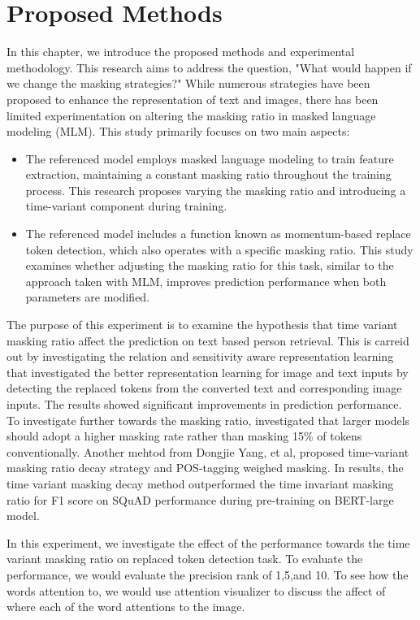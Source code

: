 \chapter{Proposed Methods}
In this chapter, we introduce the proposed methods and experimental methodology. This research aims to address the question, "What would happen if we change the masking strategies?" While numerous strategies have been proposed to enhance the representation of text and images, there has been limited experimentation on altering the masking ratio in masked language modeling (MLM). This study primarily focuses on two main aspects:

\begin{itemize}
  \item The referenced model employs masked language modeling to train feature extraction, maintaining a constant masking ratio throughout the training process. This research proposes varying the masking ratio and introducing a time-variant component during training.
  \item The referenced model includes a function known as momentum-based replace token detection, which also operates with a specific masking ratio. This study examines whether adjusting the masking ratio for this task, similar to the approach taken with MLM, improves prediction performance when both parameters are modified.
\end{itemize}
The purpose of this experiment is to examine the hypothesis that time variant masking ratio affect the prediction on text based person retrieval.
This is carreid out by investigating the relation and sensitivity aware representation learning \cite{Bai2023RaSaRA} that investigated the better representation learning for image and text inputs by detecting the replaced tokens from the converted text and corresponding image inputs. The results showed significant improvements in prediction performance. To investigate further towards the masking ratio, \cite{wettig-etal-2023-mask} investigated that larger models should adopt a higher masking rate rather than masking 15\% of tokens conventionally. Another mehtod from Dongjie Yang, et al, \cite{yang2023learningbettermaskingbetter} proposed time-variant masking ratio decay strategy and POS-tagging weighed masking. In results, the time variant masking decay method outperformed the time invariant masking ratio for F1 score on SQuAD performance during pre-training on BERT-large model. 

In this experiment, we investigate the effect of the performance towards the time variant masking ratio on replaced token detection task. To evaluate the performance, we would evaluate the precision rank of 1,5,and 10. To see how the words attention to, we would use attention visualizer to discuss the affect of where each of the word attentions to the image. 

